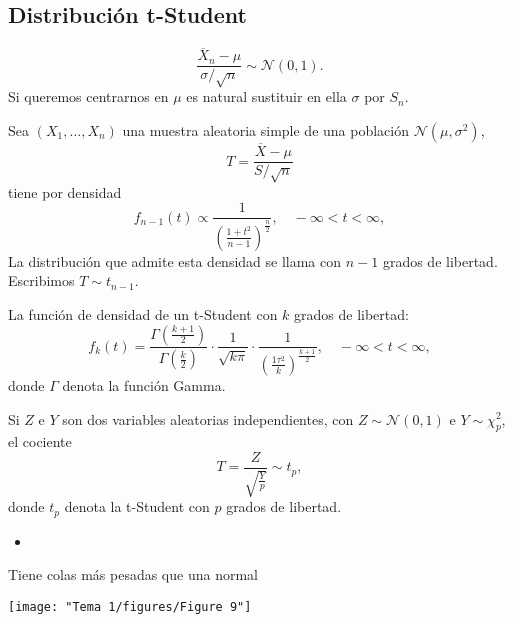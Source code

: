 \subsection{Distribución t-Student}
\begin{tcolorbox}[colback=blue!5!white, colframe=blue!75!black, title=\textbf{Hemos visto, si $X$ es Normal:}]
\[
  \dfrac{\overline{X}_n-\mu}{\sigma / \sqrt{n} }\sim \mathcal{N}(0,1).
\] Si queremos centrarnos en $\mu$ es natural sustituir en ella $\sigma$ por $S_n$.
\end{tcolorbox}
\begin{tcolorbox}[colback=blue!5!white, colframe=blue!75!black, title=\textbf{Proposición}]
Sea $(X_1,\dots,X_n)$ una muestra aleatoria simple de una población $\mathcal{N}(\mu,\sigma^2)$, \[
  T=\dfrac{\overline{X}-\mu}{S / \sqrt{n} }
\] tiene por densidad 
\begin{equation}
  f_{n-1}(t)\propto \dfrac{1}{\left( \frac{1+t^2}{n-1}  \right)^{\frac{n}{2}  }},\quad-\infty<t<\infty,
\end{equation}
La distribución que admite esta densidad se llama  con $n-1$ grados de libertad. Escribimos  $T\sim t_{n-1}$.
\end{tcolorbox}
\begin{tcolorbox}[colback=red!5!white, colframe=red!75!black, title=\textbf{Su densidad}]
La función de densidad de un t-Student con $k$ grados de libertad: \[
f_k(t)=\dfrac{\Gamma\left( \frac{k+1}{2}  \right) }{\Gamma\left( \frac{k}{2}  \right) }\cdot \dfrac{1}{\sqrt{k\pi} }\cdot \dfrac{1}{\left( \frac{1\tau^2}{k}  \right) ^{\frac{k+1}{2} }},\quad-\infty<t<\infty,
\] donde $\Gamma$ denota la función Gamma.
\end{tcolorbox}
\begin{tcolorbox}[colback=blue!5!white, colframe=blue!75!black, title=\textbf{Caracterización de la t-Student como cociente}]
Si $Z$ e $Y$ son dos variables aleatorias independientes, con $Z\sim \mathcal{N}(0,1)$ e $Y\sim \chi_p^2$, el cociente \[
T=\dfrac{Z}{\sqrt{\frac{Y}{p} } }\sim t_p,
\] donde $t_p$ denota la t-Student con  $p$ grados de libertad.
\end{tcolorbox}
\begin{itemize}[label=\color{red}\textbullet, leftmargin=*]
  \item {}
\end{itemize}
Tiene colas más pesadas que una normal
\begin{center}
  \texttt{[image: "Tema 1/figures/Figure 9"]}
\end{center}
